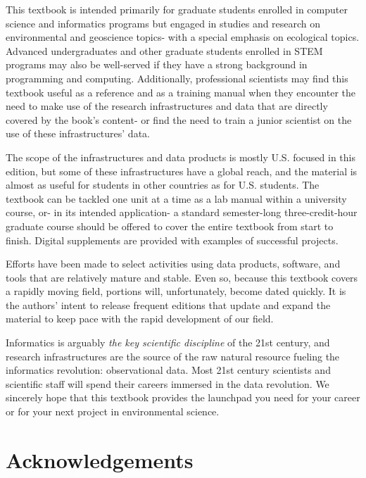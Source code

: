 \documentclass[
  letterpaper,
]{book}
\begin{document}
This textbook is intended primarily for graduate students enrolled in
computer science and informatics programs but engaged in studies and
research on environmental and geoscience topics- with a special emphasis
on ecological topics. Advanced undergraduates and other graduate
students enrolled in STEM programs may also be well-served if they have
a strong background in programming and computing. Additionally,
professional scientists may find this textbook useful as a reference and
as a training manual when they encounter the need to make use of the
research infrastructures and data that are directly covered by the
book's content- or find the need to train a junior scientist on the use
of these infrastructures' data.

The scope of the infrastructures and data products is mostly U.S.
focused in this edition, but some of these infrastructures have a global
reach, and the material is almost as useful for students in other
countries as for U.S. students. The textbook can be tackled one unit at
a time as a lab manual within a university course, or- in its intended
application- a standard semester-long three-credit-hour graduate course
should be offered to cover the entire textbook from start to finish.
Digital supplements are provided with examples of successful projects.

Efforts have been made to select activities using data products,
software, and tools that are relatively mature and stable. Even so,
because this textbook covers a rapidly moving field, portions will,
unfortunately, become dated quickly. It is the authors' intent to
release frequent editions that update and expand the material to keep
pace with the rapid development of our field.

Informatics is arguably \emph{the key scientific discipline} of the 21st
century, and research infrastructures are the source of the raw natural
resource fueling the informatics revolution: observational data. Most
21st century scientists and scientific staff will spend their careers
immersed in the data revolution. We sincerely hope that this textbook
provides the launchpad you need for your career or for your next project
in environmental science.

\section*{Acknowledgements}\label{acknowledgements}

\end{document}
